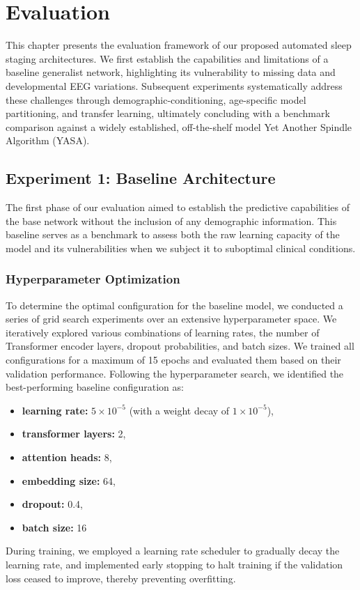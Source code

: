 \chapter{Evaluation}

This chapter presents the evaluation framework of our proposed automated sleep staging architectures.
We first establish the capabilities and limitations of a baseline generalist network,
highlighting its vulnerability to missing data and developmental EEG variations.
Subsequent experiments systematically address these challenges through demographic-conditioning,
age-specific model partitioning, and transfer learning, ultimately concluding with a benchmark comparison
against a widely established, off-the-shelf model Yet Another Spindle Algorithm (YASA).

\section{Experiment 1: Baseline Architecture}
The first phase of our evaluation aimed to establish the predictive capabilities of the base network without the inclusion of any demographic information. This baseline serves as a benchmark to assess both the raw learning capacity of the model and its vulnerabilities when we subject it to suboptimal clinical conditions.

\subsection{Hyperparameter Optimization}
To determine the optimal configuration for the baseline model, we conducted a series of grid search experiments over an extensive hyperparameter space. We iteratively explored various combinations of learning rates, the number of Transformer encoder layers, dropout probabilities, and batch sizes. We trained all configurations for a maximum of 15 epochs and evaluated them based on their validation performance.
Following the hyperparameter search, we identified the best-performing baseline configuration as:
\begin{itemize}
    \item \textbf{learning rate:} $5 \times 10^{-5}$ (with a weight decay of $1 \times 10^{-5}$),
    \item \textbf{transformer layers:} 2,
    \item \textbf{attention heads:} 8,
    \item \textbf{embedding size:} 64,
    \item \textbf{dropout:} 0.4,
    \item \textbf{batch size:} 16
\end{itemize}
During training, we employed a learning rate scheduler to gradually decay the learning rate, and implemented early stopping to halt training if the validation loss ceased to improve, thereby preventing overfitting.

